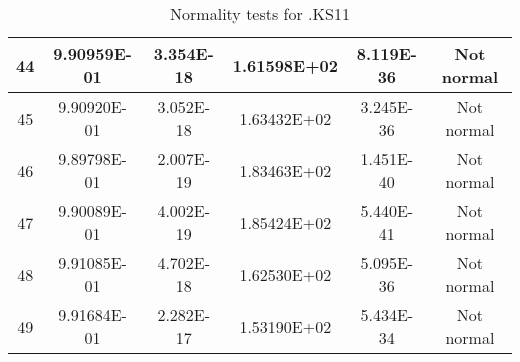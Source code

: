 \begin{table}[h]
\begin{tabular}{|c|c|c|c|c|c|}
		44 & 9.90959E-01 & 3.354E-18 & 1.61598E+02 & 8.119E-36 & Not normal\\\hline
		45 & 9.90920E-01 & 3.052E-18 & 1.63432E+02 & 3.245E-36 & Not normal\\\hline
		46 & 9.89798E-01 & 2.007E-19 & 1.83463E+02 & 1.451E-40 & Not normal\\\hline
		47 & 9.90089E-01 & 4.002E-19 & 1.85424E+02 & 5.440E-41 & Not normal\\\hline
		48 & 9.91085E-01 & 4.702E-18 & 1.62530E+02 & 5.095E-36 & Not normal\\\hline
		49 & 9.91684E-01 & 2.282E-17 & 1.53190E+02 & 5.434E-34 & Not normal\\\hline
	\end{tabular}
	\caption{Normality tests for .KS11}
\end{table}
